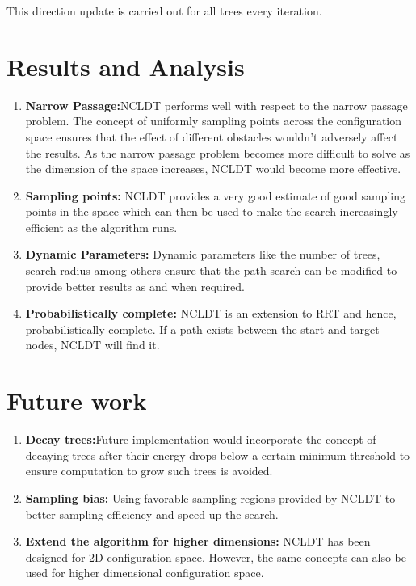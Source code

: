 \documentclass[fleqn]{article}
\begin{document}
	This direction update is carried out for all trees every iteration.
 

	
	\section*{Results and Analysis}  
		\begin{enumerate}
		\item \textbf{Narrow Passage:}NCLDT performs well with respect to the narrow passage problem. The concept of uniformly sampling points across the configuration space ensures that the effect of different obstacles wouldn't adversely affect the results. As the narrow passage problem becomes more difficult to solve as the dimension of the space increases, NCLDT would become more effective.
		\item \textbf{Sampling points:} NCLDT provides a very good estimate of good sampling points in the space which can then be used to make the search increasingly efficient as the algorithm runs.
		\item \textbf{Dynamic Parameters:} Dynamic parameters like the number of trees, search radius among others ensure that the path search can be modified to provide better results as and when required.
		\item \textbf{Probabilistically complete:} NCLDT is an extension to RRT and hence, probabilistically complete. If a path exists between the start and target nodes, NCLDT will find it.
	\end{enumerate}
	
	
	\section*{Future work}
		\begin{enumerate}
		\item \textbf{Decay trees:}Future implementation would incorporate the concept of decaying trees after their energy drops below a certain minimum threshold to ensure computation to grow such trees is avoided.
		\item \textbf{Sampling bias:} Using favorable sampling regions provided by NCLDT to better sampling efficiency and speed up the search.
		\item \textbf{Extend the algorithm for higher dimensions:} NCLDT has been designed for 2D configuration space. However, the same concepts can also be used for higher dimensional configuration space.
	\end{enumerate}
	
\end{document}
